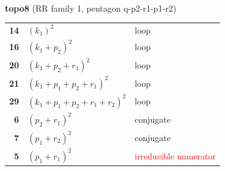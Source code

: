 \documentclass[10pt]{article}
\begin{document}
\begin{minipage}[t]{0.48\textwidth}
{}\\[2mm]\textbf{topo8} (RR family 1, pentagon q-p2-r1-p1-r2)\\[2pt]{\footnotesize\begin{tabular}{@{}r@{\ \ }l@{\ \ }l@{}}\textbf{14} & $(k_1)^2$ & loop\\
\textbf{16} & $(k_1+p_2)^2$ & loop\\
\textbf{20} & $(k_1+p_2+r_1)^2$ & loop\\
\textbf{21} & $(k_1+p_1+p_2+r_1)^2$ & loop\\
\textbf{29} & $(k_1+p_1+p_2+r_1+r_2)^2$ & loop\\
\textbf{6} & $(p_2+r_1)^2$ & conjugate\\
\textbf{7} & $(p_1+r_2)^2$ & conjugate\\
\textbf{5} & $(p_1+r_1)^2$ & \textcolor{red}{irreducible numerator}\\\end{tabular}}\end{minipage}

\bigskip
\end{document}
